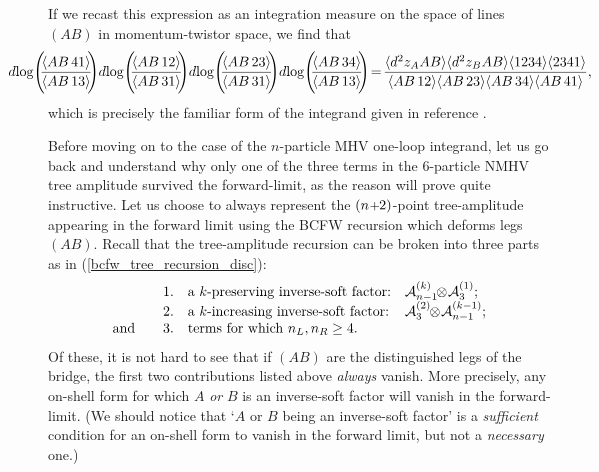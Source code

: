 \documentclass[12pt,hyperref,compress]{JHEP3}
\newcommand{\eq}[1]{\begin{equation}#1\end{equation}}
\newcommand{\pl}{\hspace{0.5pt}\text{{\small+}}\hspace{-0.5pt}}
\newcommand{\ab}[1]{\langle #1 \rangle}
\begin{document}
If we recast this expression as an integration measure on the space of lines $(AB)$ in momentum-twistor space, we find that
\vspace{-.2cm}\eq{\hspace{-2cm}d\!\log\!\Bigg(\!\!\frac{\ab{AB\,41}}{\ab{AB\,13}}\!\!\Bigg)d\!\log\!\Bigg(\!\!\frac{\ab{AB\,12}}{\ab{AB\,31}}\!\!\Bigg)d\!\log\!\Bigg(\!\!\frac{\ab{AB\,23}}{\ab{AB\,31}}\!\!\Bigg)d\!\log\!\Bigg(\!\!\frac{\ab{AB\,34}}{\ab{AB\,13}}\!\!\Bigg)\!=\!\displaystyle\frac{\ab{d^2z_AAB}\ab{d^2z_BAB}\ab{1234}\ab{2341}}{\ab{AB\,12}\ab{AB\,23}\ab{AB\,34}\ab{AB\,41}},\hspace{-2cm}\vspace{-.2cm}\nonumber}
which is precisely the familiar form of the integrand given in reference \cite{ArkaniHamed:2010kv}.

Before moving on to the case of the $n$-particle MHV one-loop integrand, let us go back and understand why only one of the three terms in the $6$-particle NMHV tree amplitude survived the forward-limit, as the reason will prove quite instructive. Let us choose to always represent the $(n\pl2)$-point tree-amplitude appearing in the forward limit using the BCFW recursion which deforms legs $(AB)$. Recall that the tree-amplitude recursion can be broken into three parts as in (\ref{bcfw_tree_recursion_disc}):
\vspace{-.2cm}\eq{\begin{array}{rll}1.&\text{a $k$-preserving inverse-soft factor:}& \mathcal{A}_{n-1}^{(k)}\!\!\otimes\!\mathcal{A}_3^{(1)};\\
2.&\text{a $k$-increasing inverse-soft factor:}&\mathcal{A}_{3}^{(2)}\!\!\otimes\!\mathcal{A}_{n-1}^{(k-1)};\\\mathrm{and}\qquad3.&\text{terms for which $n_L,n_R\geq4$.}\end{array}\vspace{-.2cm}}
Of these, it is not hard to see that if $(AB)$ are the distinguished legs of the bridge, the first two contributions listed above {\it always} vanish. More precisely, any on-shell form for which $A$ {\it or} $B$ is an inverse-soft factor will vanish in the forward-limit. (We should notice that `$A$ or $B$ being an inverse-soft factor' is a {\it sufficient} condition for an on-shell form to vanish in the forward limit, but not a {\it necessary} one.)
\end{document}
